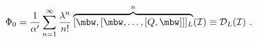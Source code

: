 \begin{equation}\label{phi}
\Phi_0=\frac{1}{\alpha'}
\sum_{n=1}^{\infty}
\frac{\lambda^n}{n!}\overbrace{[\mbw,[\mbw,\dots,[Q,\mbw]]]_L}^{n}
(\mathcal{I})\equiv 
\mathcal{D}_L(\mathcal{I})\ .
\end{equation}

